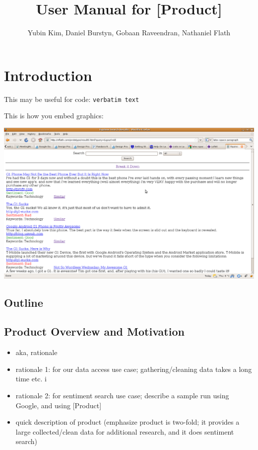 \documentclass[titlepage]{article}
\title{User Manual for [Product]}
\author{Yubin Kim, Daniel Burstyn, Gobaan Raveendran, Nathaniel Flath}
\begin{document}
\maketitle
\newpage
\tableofcontents
\newpage

\section{Introduction}
This may be useful for code: \verb!verbatim text!

This is how you embed graphics:

\begin{center}
\includegraphics[width=15cm]{screenshot.png}
\end{center}

\subsection{Outline}

\subsection{Product Overview and Motivation}
\begin{itemize}
\setlength{\itemsep}{-1mm}
\item aka, rationale
\item rationale 1: for our data access use case; gathering/cleaning data takes
a long time etc. i
\item rationale 2: for sentiment search use case; describe a sample run using
Google, and using [Product]
\item quick description of product (emphasize product is two-fold; it provides
a large collected/clean data for additional research, and it does sentiment
search)
\end{itemize}
\end{document}

